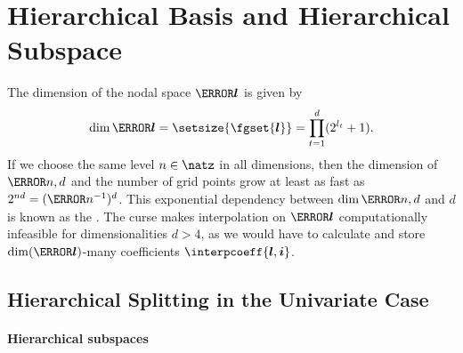\section{Hierarchical Basis and Hierarchical Subspace}
\label{sec:22hierSubspaces}


\noindent
The dimension of the nodal space $\ns{\*l}$ is given by
\begin{equation}
  \label{eq:dimensionFG}
  \dim \ns{\*l}
  = \setsize{\fgset{\*l}}
  = \prod_{t=1}^d (2^{l_t} + 1).
\end{equation}
If we choose the same level $n \in \natz$ in all dimensions,
then the dimension of $\ns{n,d}$ and the
number of grid points grow at least as fast as
$2^{nd} = (\ms{n}^{-1})^d$.
This exponential dependency between $\dim \ns{n,d}$ and $d$ is known as the
 \cite{Bellman61Adaptive}.
The curse makes interpolation on $\ns{\*l}$ computationally infeasible
for dimensionalities $d > 4$,
as we would have to calculate and store
$\dim(\ns{\*l})$-many coefficients $\interpcoeff{\*l,\*i}$.%



\subsection{Hierarchical Splitting in the Univariate Case}
\label{sec:221hierUV}

\paragraph{Hierarchical subspaces}

